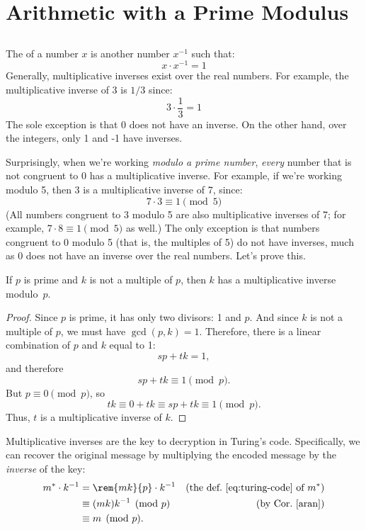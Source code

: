 \section{Arithmetic with a Prime Modulus}\label{mod_prime_sec}

\subsection{}
\label{sec:prime}

The  of a number $x$ is another number
$x^{-1}$ such that:
%
\[
x \cdot x^{-1} = 1
\]
Generally, multiplicative inverses exist over the real numbers.  For
example, the multiplicative inverse of 3 is $1 / 3$ since:
%
\[
3 \cdot \frac{1}{3} = 1
\]
%
The sole exception is that 0 does not have an inverse.
On the other hand, over the integers, only 1 and -1 have inverses.

Surprisingly, when we're working \emph{modulo a prime number},
\emph{every} number that is not congruent to 0 has a multiplicative
inverse.  For example, if we're working modulo 5, then 3 is a
multiplicative inverse of 7, since:
%
\[
7 \cdot 3 \equiv 1 \pmod{5}
\]
%
(All numbers congruent to 3 modulo 5 are also multiplicative inverses
of 7; for example, $7 \cdot 8 \equiv 1 \pmod{5}$ as well.)  The only
exception is that numbers congruent to 0 modulo 5 (that is, the
multiples of 5) do not have inverses, much as 0 does not have an
inverse over the real numbers.  Let's prove this.

\begin{lemma}
\label{lem:inverses}
If $p$ is prime and $k$ is not a multiple of $p$, then $k$ has a
multiplicative inverse modulo~$p$.
\end{lemma}

\begin{proof}
Since $p$ is prime, it has only two divisors: 1 and $p$.  And since
$k$ is not a multiple of $p$, we must have $\gcd(p, k) = 1$.
Therefore, there is a linear combination of $p$ and $k$ equal to 1:
\[
s p + t k = 1,
\]
and therefore
\[
s p + t k \equiv 1 \pmod{p}.
\]
But $p \equiv 0 \pmod{p}$, so
\[
tk \equiv 0 + tk \equiv sp +tk \equiv 1 \pmod{p}.
\]
Thus, $t$ is a multiplicative inverse of $k$.
\end{proof}

Multiplicative inverses are the key to decryption in Turing's code.
Specifically, we can recover the original message by multiplying the
encoded message by the \emph{inverse} of the key:
\begin{align*}
m^* \cdot k^{-1}
    & = \rem{mk}{p} \cdot k^{-1}
         & \text{(the def.~\eqref{eq:turing-code} of $m^*$)}\\
    & \equiv (mk)k^{-1} \pmod{p} & \text{(by Cor.~\ref{aran})}\\
    & \equiv m \pmod{p}.
\end{align*}

